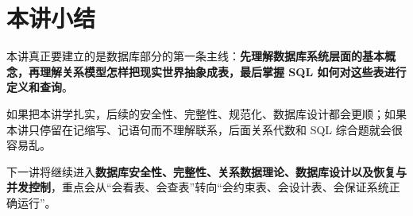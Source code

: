 \documentclass{../../note}
\begin{document}
\section{本讲小结}

本讲真正要建立的是数据库部分的第一条主线：\textbf{先理解数据库系统层面的基本概念，再理解关系模型怎样把现实世界抽象成表，最后掌握 SQL 如何对这些表进行定义和查询}。

如果把本讲学扎实，后续的安全性、完整性、规范化、数据库设计都会更顺；如果本讲只停留在记缩写、记语句而不理解联系，后面关系代数和 SQL 综合题就会很容易乱。

下一讲将继续进入\textbf{数据库安全性、完整性、关系数据理论、数据库设计以及恢复与并发控制}，重点会从“会看表、会查表”转向“会约束表、会设计表、会保证系统正确运行”。
\end{document}
